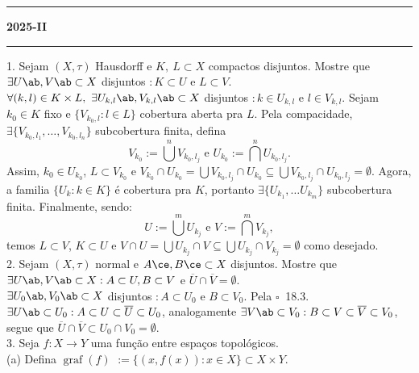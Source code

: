 \newcommand{\F}{\mathbb{F}}
\newcommand{\C}{\mathbb{C}}
\newcommand{\an}{\mathscr{A}} 
\newcommand{\Q}{\mathbb{Q}}
\renewcommand{\hom}{\operatorname{Hom}}
\newcommand{\ehom}{\operatorname{End}}

\-\vspace{-0.3cm}
  {\hrule \vspace{-0.15cm}
  \centering \textbf{2025-II} \vspace{0.1cm}
  \hrule}

1. Sejam \((X, \tau)\) Hausdorff e \(K, \ L \subset X\) compactos disjuntos. Mostre que \(\exists U\ab, V\ab \subset X\) disjuntos \(: K\subset U\) e \(L\subset V\). \\ 
\textcolor{gris}{ \hspace{-0cm}\(\forall (k,l) \in K \times  L, \ \exists U_{k,l}\ab, V_{k,l}\ab\subset X\) disjuntos \(: k \in U_{k,l}\) e \(l\in V_{k,l}\). Sejam \(k_0 \in K\) fixo e \(\{V_{k_0, l} : l \in L\}\) cobertura aberta pra \(L\). Pela compacidade, \(\exists \{V_{k_0, l_1}, \ldots, V_{k_0, l_n} \}\) subcobertura finita, defina
  \[V_{k_0} := \bigcup^{n} V_{k_0,l_j} \text{\ \ e \ \ } U_{k_0} := \bigcap^{n} U_{k_0,l_j}. \]
  Assim, \(k_0 \in U_{k_0}\), \(L \subset V_{k_0}\) e \(V_{k_0} \cap U_{k_0} = \bigcup V_{k_0,l_j} \cap U_{k_0} \subseteq \bigcup V_{k_0,l_j} \cap U_{k_0, l_j} = \emptyset \). Agora, a familia \(\{U_k : k \in K\}\) é cobertura pra \(K\), portanto \(\exists \{U_{k_1}, \ldots U_{k_m}\}\) subcobertura finita. Finalmente, sendo: 
  \[U := \bigcup^m U_{k_j} \text{ \ \ e \ \ } V := \bigcap^m V_{k_j},\]
  temos \(L\subset V\), \(K\subset U\) e \(V\cap U = \bigcup U_{k_j}\cap V \subseteq \bigcup U_{k_j} \cap V_{k_j}  = \emptyset\) como desejado. }
 \\
2. Sejam \((X, \tau)\) normal e \(A\ce,B\ce\subset X\) disjuntos. Mostre que \(\exists U\ab, V\ab \subset X : A \subset U, B\subset V\) e \(\overline{U} \cap \overline{V} = \emptyset\). \\ 
\textcolor{gris}{
  \(\exists U_0\ab, V_0\ab\subset X\) disjuntos \(: A \subset U_0\) e \(B\subset V_0\). Pela \(\square \ \) 18.3. \(\exists U\ab \subset U_0 : A \subset U \subset \overline{U} \subset U_0\), analogamente \(\exists V\ab \subset V_0 : B \subset V \subset \overline{V} \subset V_0\), segue que \(\overline{U}\cap \overline{V}\subset U_0\cap V_0 = \emptyset\).  
}\\ 
3. Seja \(f: X\to Y\) uma função entre espaços topológicos. \\ 
(a) Defina \(\operatorname{graf}(f)\) \textcolor{gris}{\(:= \{(x,f(x)) : x \in X\}\subset X\times Y \). }  \\
